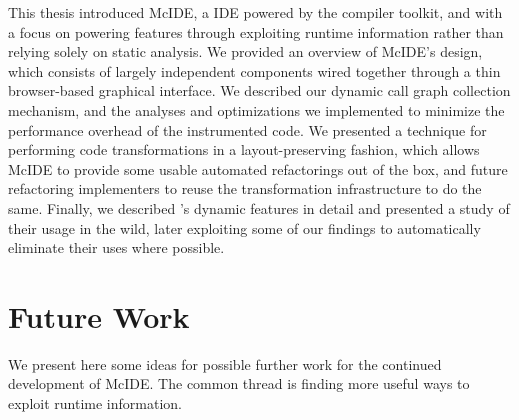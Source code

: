 This thesis introduced McIDE, a \matlab IDE powered by the \mclab compiler
toolkit, and with a focus on powering features through exploiting runtime
information rather than relying solely on static analysis. We provided an
overview of McIDE's design, which consists of largely independent components
wired together through a thin browser-based graphical interface. We described
our dynamic call graph collection mechanism, and the analyses and optimizations
we implemented to minimize the performance overhead of the instrumented code.
We presented a technique for performing code transformations in a
layout-preserving fashion, which allows McIDE to provide some usable automated
refactorings out of the box, and future refactoring implementers to reuse the
transformation infrastructure to do the same. Finally, we described \matlab's
dynamic features in detail and presented a study of their usage in the wild,
later exploiting some of our findings to automatically eliminate their uses
where possible.

\section{Future Work}

We present here some ideas for possible further work for the continued
development of McIDE. The common thread is finding more useful ways to exploit
runtime information.


